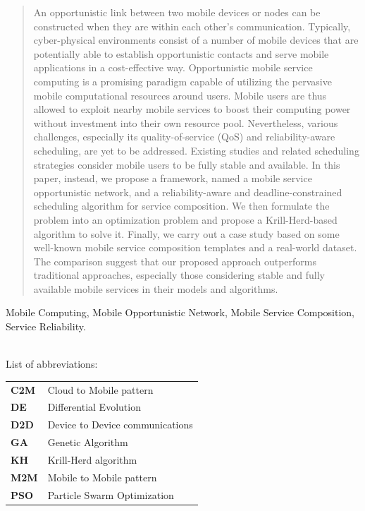 \documentclass[journal]{IEEEtran}
\begin{document}
\begin{abstract}
An opportunistic link between two mobile devices or nodes can be constructed when they are within each other's communication. Typically, cyber-physical environments consist of a number of mobile devices that are potentially able to establish opportunistic contacts and serve mobile applications in a cost-effective way.
Opportunistic mobile service computing is a promising paradigm capable of utilizing the pervasive mobile computational resources around users. Mobile users are thus allowed to exploit nearby mobile services to boost their computing power without investment into their own resource pool. 
Nevertheless, various challenges, especially its quality-of-service (QoS) and reliability-aware scheduling, are yet to be addressed. Existing studies and related scheduling strategies consider mobile users to be fully stable and available.
In this paper, instead, we propose a framework, named a mobile service opportunistic network, and a reliability-aware and deadline-constrained scheduling algorithm for service composition. 
We then formulate the problem into an optimization problem and propose a Krill-Herd-based algorithm to solve it.
Finally, we carry out a case study based on some well-known mobile service composition templates and a real-world dataset. The comparison suggest that our proposed approach outperforms traditional approaches, especially those considering stable and fully available mobile services in their models and algorithms.
\end{abstract}

\begin{IEEEkeywords}
Mobile Computing, Mobile Opportunistic Network, Mobile Service Composition, Service Reliability.
\end{IEEEkeywords}

~\\
\noindent List of abbreviations:
~\\

\noindent
\begin{tabular}{@{} l p{7.36cm} }
\textbf{C2M}   &   Cloud to Mobile pattern\\
\textbf{DE}    &   Differential Evolution \\
\textbf{D2D}   &   Device to Device communications \\
\textbf{GA}    &   Genetic Algorithm \\
\textbf{KH}    &   Krill-Herd algorithm \\
\textbf{M2M}   &   Mobile to Mobile pattern \\
\textbf{PSO}   &   Particle Swarm Optimization \\
\end{tabular}
\end{document}
